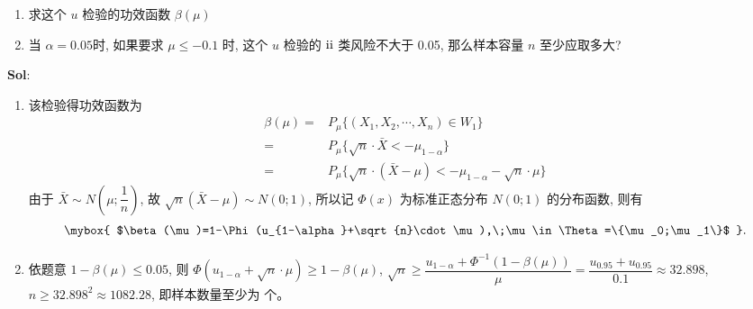 \begin{enumerate}[(1)]
    \item 求这个 $u$ 检验的功效函数 $\beta(\mu)$
    \item 当 $\alpha=0.05$时, 如果要求 $\mu\leqslant-0.1$ 时, 这个 $u$ 检验的 $\text{\uppercase\expandafter{\romannumeral2}}$ 类风险不大于 0.05, 那么样本容量 $n$ 至少应取多大?
\end{enumerate}

\textbf{Sol}: 

\begin{enumerate}[(1)]
    \item 该检验得功效函数为
    $$
    \begin{aligned}
    \beta(\mu)=&P_{\mu}\big\{(X_1,X_2,\cdots,X_n)\in W_1\big\}\\
    =&P_{\mu}\big\{\sqrt{n}\cdot\bar{X}<-\mu_{1-\alpha}\big\}\\
    =&P_{\mu}\big\{\sqrt{n}\cdot(\bar{X}-\mu)<-\mu_{1-\alpha}-\sqrt{n}\cdot\mu\big\}
    \end{aligned}
    $$
    由于 $\bar{X}\sim N(\mu;\dfrac{1}{n})$, 故 $\sqrt{n}(\bar{X}-\mu)\sim N(0;1)$, 所以记 $\Phi(x)$ 为标准正态分布 $N(0;1)$ 的分布函数, 则有
    $$
    \mybox{
        $\beta(\mu)=1-\Phi(u_{1-\alpha}+\sqrt{n}\cdot \mu),\;\mu\in\Theta=\{\mu_0;\mu_1\}$
    }.
    $$
    
    \item 依题意 $1-\beta(\mu)\leqslant 0.05$, 则 $\Phi(u_{1-\alpha}+\sqrt{n}\cdot \mu)\geqslant 1-\beta(\mu)$, 
    $\sqrt{n}\geqslant \dfrac{u_{1-\alpha}+\Phi^{-1}(1-\beta(\mu))}{\mu}=\dfrac{u_{0.95}+u_{0.95}}{0.1}\approx32.898$,$n\geqslant32.898^2\approx 1082.28$, 即样本数量至少为  个。
\end{enumerate}

\vspace{12pt}



